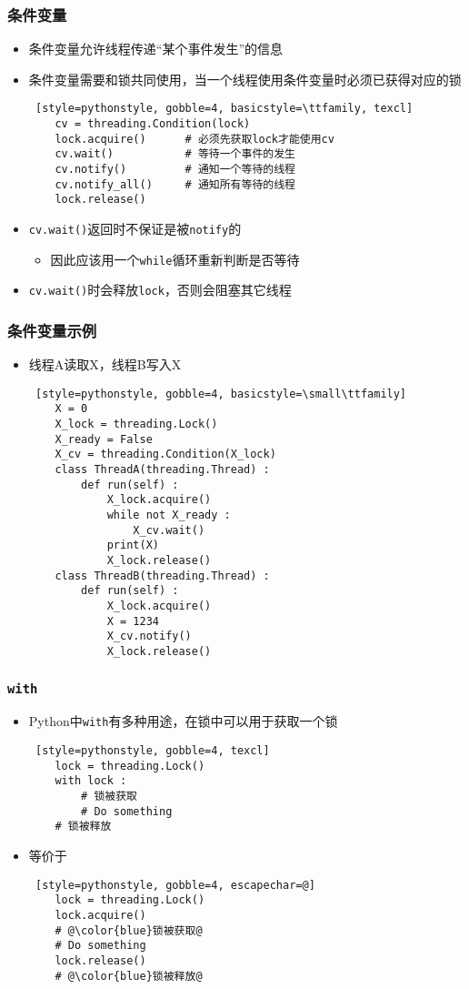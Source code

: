\begin{CJK}{UTF8}{gbsn}
\begin{frame} [fragile]
	\frametitle{条件变量}
	\begin{itemize}
	\item 条件变量允许线程传递``某个事件发生''的信息
	\item 条件变量需要和锁共同使用，当一个线程使用条件变量时必须已获得对应的锁
	\begin{lstlisting} [style=pythonstyle, gobble=4, basicstyle=\ttfamily, texcl]
	cv = threading.Condition(lock)
	lock.acquire()		# 必须先获取lock才能使用cv
	cv.wait()			# 等待一个事件的发生
	cv.notify()			# 通知一个等待的线程
	cv.notify_all()		# 通知所有等待的线程
	lock.release()
	\end{lstlisting}
	\item \texttt{cv.wait()}返回时不保证是被\texttt{notify}的
		\begin{itemize}
		\item 因此应该用一个\texttt{while}循环重新判断是否等待
		\end{itemize}
	\item \texttt{cv.wait()}时会释放\texttt{lock}，否则会阻塞其它线程
	\end{itemize}
\end{frame}

\begin{frame} [fragile]
	\frametitle{条件变量示例}
	\begin{itemize}
	\item 线程A读取X，线程B写入X
	\begin{lstlisting} [style=pythonstyle, gobble=4, basicstyle=\small\ttfamily]
	X = 0
	X_lock = threading.Lock()
	X_ready = False
	X_cv = threading.Condition(X_lock)
	class ThreadA(threading.Thread) :
		def run(self) :
			X_lock.acquire()
			while not X_ready :
				X_cv.wait()
			print(X)
			X_lock.release()
	class ThreadB(threading.Thread) :
		def run(self) :
			X_lock.acquire()
			X = 1234
			X_cv.notify()
			X_lock.release()
	\end{lstlisting}
	\end{itemize}
\end{frame}

\begin{frame} [fragile]
	\frametitle{\texttt{with}}
	\begin{itemize}
	\item Python中\texttt{with}有多种用途，在锁中可以用于获取一个锁
	\begin{lstlisting} [style=pythonstyle, gobble=4, texcl]
	lock = threading.Lock()
	with lock :
		# 锁被获取
		# Do something
	# 锁被释放
	\end{lstlisting}
	\item 等价于
	\begin{lstlisting} [style=pythonstyle, gobble=4, escapechar=@]
	lock = threading.Lock()
	lock.acquire()
	# @\color{blue}锁被获取@
	# Do something
	lock.release()
	# @\color{blue}锁被释放@
	\end{lstlisting}
	\end{itemize}
\end{frame}


\end{CJK}
